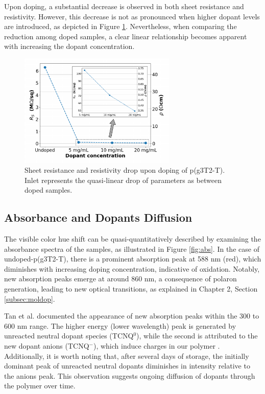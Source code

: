 Upon doping, a substantial decrease is observed in both sheet resistance and resistivity. However, this decrease is not as pronounced when higher dopant levels are introduced, as depicted in Figure \ref{fig:rho}. Nevertheless, when comparing the reduction among doped samples, a clear linear relationship becomes apparent with increasing the dopant concentration. 

\begin{figure}[ht]
  \centering
  \includegraphics[width=7.5cm]{Images/pdf/resist+inlet.pdf}
  \caption[Sheet resistance and resistivity drop upon doping]{Sheet resistance and resistivity drop upon doping of p(g3T2-T). Inlet represents the quasi-linear drop of parameters as between doped samples.}
  \label{fig:rho}
\end{figure}

\subsection{Absorbance and Dopants Diffusion}
The visible color hue shift can be quasi-quantitatively described by examining the absorbance spectra of the samples, as illustrated in Figure \ref{fig:abs}. In the case of undoped-p(g3T2-T), there is a prominent absorption peak at 588 nm (red), which diminishes with increasing doping concentration, indicative of oxidation. Notably, new absorption peaks emerge at around 860 nm, a consequence of polaron generation, leading to new optical transitions, as explained in Chapter 2, Section \ref{subsec:moldop}. 

Tan et al. documented the appearance of new absorption peaks within the 300 to 600 nm range. The higher energy (lower wavelength) peak is generated by unreacted neutral dopant species (TCNQ$^{0}$), while the second is attributed to the new dopant anions (TCNQ$^{-}$), which induce charges in our polymer \cite{tanTuningOrganicElectrochemical2022}. Additionally, it is worth noting that, after several days of storage, the initially dominant peak of unreacted neutral dopants diminishes in intensity relative to the anions peak. This observation suggests ongoing diffusion of dopants through the polymer over time. 

